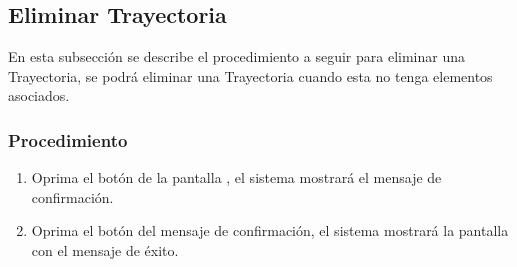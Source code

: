 \subsection{Eliminar Trayectoria}

En esta subsección se describe el procedimiento a seguir para eliminar una Trayectoria, se podrá eliminar una Trayectoria cuando esta no tenga elementos asociados.

\subsubsection{Procedimiento}
\begin{enumerate}
	\item Oprima el botón \btnEliminar de la pantalla , el sistema mostrará el mensaje de confirmación.
	
	\item Oprima el botón  del mensaje de confirmación, el sistema mostrará la pantalla  con el mensaje de éxito.
\end{enumerate}

